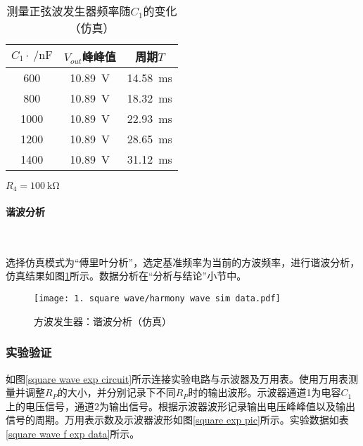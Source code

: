 \documentclass[UTF8]{ctexart}
\numberwithin{figure}{subsection}
\numberwithin{table}{subsection}
\numberwithin{equation}{subsection}
\begin{document}
\begin{table}[h]
    \begin{center}
        \caption{测量正弦波发生器频率随\(C_1\)的变化（仿真）}
        \begin{tabular}{|c|c|c|}
            \hline
            \(C_1\cdot \SI{}{\per\nano\farad}\) & \(V_{out}\)峰峰值 & 周期\(T\) \\
            \hline
            600 & \SI{10.89}{\volt} & \SI{14.58}{\milli\second} \\
            \hline
            800 & \SI{10.89}{\volt} & \SI{18.32}{\milli\second} \\
            \hline
            1000 & \SI{10.89}{\volt} & \SI{22.93}{\milli\second} \\
            \hline
            1200 & \SI{10.89}{\volt} & \SI{28.65}{\milli\second} \\
            \hline
            1400 & \SI{10.89}{\volt} & \SI{31.12}{\milli\second} \\
            \hline
        \end{tabular}
        \par \(R_4=\SI{100}{\kilo\ohm}\)
    \end{center}
    
    \label{square wave f sim data c change}
\end{table}


\paragraph{谐波分析 }~{}
\par 选择仿真模式为“傅里叶分析”，选定基准频率为当前的方波频率，进行谐波分析，仿真结果如图\ref{square harmony wave sim data}所示。数据分析在“分析与结论”小节中。

\begin{figure}[H]
    \begin{center}
        \caption{方波发生器：谐波分析（仿真）}
        \texttt{[image: 1. square wave/harmony wave sim data.pdf]}
        \label{square harmony wave sim data}
    \end{center}
\end{figure}


\subsubsection{实验验证}
\par 如图\ref{square wave exp circuit}所示连接实验电路与示波器及万用表。使用万用表测量并调整\(R_P\)的大小，并分别记录下不同\(R_P\)时的输出波形。示波器通道1为电容\(C_1\)上的电压信号，通道2为输出信号。根据示波器波形记录输出电压峰峰值以及输出信号的周期。万用表示数及示波器波形如图\ref{square exp pic}所示。实验数据如表\ref{square wave f exp data}所示。
\end{document}
